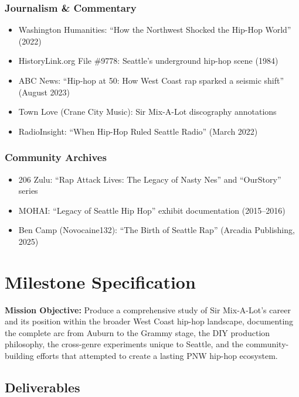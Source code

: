 \documentclass[11pt,letterpaper]{article}
\newcommand{\stageheader}[2]{\noindent\colorbox{#2}{\makebox[\textwidth][l]{\textcolor{white}{\bfseries\sffamily\hspace{6pt}#1\hspace{6pt}}}}\vspace{0.5em}\par}
\newcommand{\metafield}[2]{\textbf{\sffamily #1} #2\par}
\begin{document}
\subsubsection{Journalism \& Commentary}
\begin{itemize}[leftmargin=2em]
\item Washington Humanities: ``How the Northwest Shocked the Hip-Hop World'' (2022)
\item HistoryLink.org File \#9778: Seattle's underground hip-hop scene (1984)
\item ABC News: ``Hip-hop at 50: How West Coast rap sparked a seismic shift'' (August 2023)
\item Town Love (Crane City Music): Sir Mix-A-Lot discography annotations
\item RadioInsight: ``When Hip-Hop Ruled Seattle Radio'' (March 2022)
\end{itemize}

\subsubsection{Community Archives}
\begin{itemize}[leftmargin=2em]
\item 206 Zulu: ``Rap Attack Lives: The Legacy of Nasty Nes'' and ``OurStory'' series
\item MOHAI: ``Legacy of Seattle Hip Hop'' exhibit documentation (2015--2016)
\item Ben Camp (Novocaine132): ``The Birth of Seattle Rap'' (Arcadia Publishing, 2025)
\end{itemize}

\newpage

\stageheader{STAGE 3 --- MISSION PACKAGE}{tertiary}

\section{Milestone Specification}

\metafield{Mission Objective:}{Produce a comprehensive study of Sir Mix-A-Lot's career and its position within the broader West Coast hip-hop landscape, documenting the complete arc from Auburn to the Grammy stage, the DIY production philosophy, the cross-genre experiments unique to Seattle, and the community-building efforts that attempted to create a lasting PNW hip-hop ecosystem.}

\subsection{Deliverables}
\end{document}
